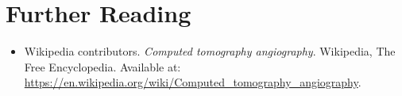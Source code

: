 \section{Further Reading}
\begin{itemize}
  \item Wikipedia contributors. \textit{Computed tomography angiography}. Wikipedia, The Free Encyclopedia. Available at: \url{https://en.wikipedia.org/wiki/Computed_tomography_angiography}.
\end{itemize}
